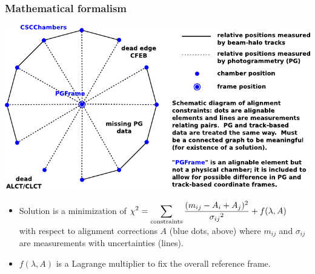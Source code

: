 \documentclass[compress]{beamer}
\begin{document}
\begin{frame}
\frametitle{Mathematical formalism}

\vspace{0.3 cm}
\includegraphics[width=\linewidth]{beamhalo-PG.pdf}

\scriptsize
\begin{itemize}
\item Solution is a minimization of $\displaystyle \chi^2 =
\sum_{\mbox{\scriptsize constraints}} \frac{(m_{ij} - A_i +
  A_j)^2}{{\sigma_{ij}}^2} + f(\lambda, A)$ \\ \vspace{0.1 cm} with respect to alignment
corrections $A$ (blue dots, above) where $m_{ij}$ and $\sigma_{ij}$ are
measurements with uncertainties (lines).

\item $f(\lambda, A)$ is a Lagrange multiplier to fix the overall reference frame.
\end{itemize}
\end{frame}

\end{document}
